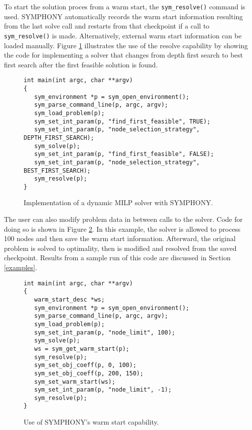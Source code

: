 To start the solution proces from a warm start, the \texttt{sym\_resolve()}
command is used. SYMPHONY automatically records the warm start information
resulting from the last solve call and restarts from that checkpoint if a call
to \texttt{sym\_resolve()} is made. Alternatively, external warm start
information can be loaded manually. Figure \ref{dynamic} illustrates the use
of the resolve capability by showing the code for implementing a solver that
changes from depth first search to best first search after the first feasible
solution is found.
\begin{figure}[tb]
\begin{Verbatim}[frame=lines]
int main(int argc, char **argv)
{
   sym_environment *p = sym_open_environment();
   sym_parse_command_line(p, argc, argv);
   sym_load_problem(p);
   sym_set_int_param(p, "find_first_feasible", TRUE);
   sym_set_int_param(p, "node_selection_strategy", DEPTH_FIRST_SEARCH);
   sym_solve(p);
   sym_set_int_param(p, "find_first_feasible", FALSE);
   sym_set_int_param(p, "node_selection_strategy", BEST_FIRST_SEARCH);
   sym_resolve(p);
}
\end{Verbatim}
\caption{Implementation of a dynamic MILP solver with SYMPHONY. 
\label{dynamic}}
\end{figure}
The user can also modify problem data in between calls to the solver. Code for
doing so is shown in Figure \ref{warm_start}. In this example, the
solver is allowed to process 100 nodes and then save the warm start
information. Afterward, the original problem is solved to optimality, then is
modified and resolved from the saved checkpoint. Results from a sample run of
this code are discussed in Section \ref{examples}.
\begin{figure}[tb]
\begin{Verbatim}[frame=lines]
int main(int argc, char **argv)
{
   warm_start_desc *ws;
   sym_environment *p = sym_open_environment();
   sym_parse_command_line(p, argc, argv);
   sym_load_problem(p);
   sym_set_int_param(p, "node_limit", 100);
   sym_solve(p);
   ws = sym_get_warm_start(p);
   sym_resolve(p);
   sym_set_obj_coeff(p, 0, 100);
   sym_set_obj_coeff(p, 200, 150);
   sym_set_warm_start(ws);
   sym_set_int_param(p, "node_limit", -1);
   sym_resolve(p);
}
\end{Verbatim}
\caption{Use of SYMPHONY's warm start capability. \label{warm_start}}
\end{figure}

